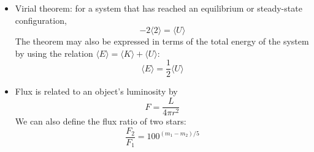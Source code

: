 \documentclass{book}
\begin{document}
\begin{itemize}
    \item Virial theorem: for a system that has reached an equilibrium or steady-state configuration,
          \begin{equation*}
              -2 \langle 2 \rangle = \langle U \rangle \tag{C\&O 2.46}
          \end{equation*}
          The theorem may also be expressed in terms of the total energy of the system by using the relation $\langle E \rangle = \langle K \rangle + \langle U \rangle$:
          \begin{equation*}
              \langle E \rangle = \frac{1}{2} \langle U \rangle
          \end{equation*}
    \item Flux is related to an object's luminosity by
          \begin{equation*}
              F = \frac{L}{4 \pi r^2} \tag{C\&O 3.2}
          \end{equation*}
          We can also define the flux ratio of two stars:
          \begin{equation*}
              \frac{F_2}{F_1} = 100^{(m_1 - m_2)/5}
          \end{equation*}
\end{itemize}
\end{document}
